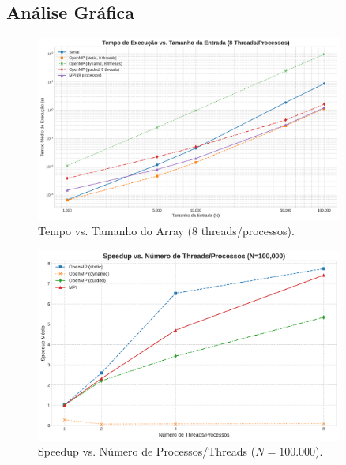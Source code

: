 \documentclass[12pt, a4paper]{article}
\begin{document}
\subsection{Análise Gráfica}

\begin{figure}[H]
    \centering
    \includegraphics[width=0.9\textwidth]{../graficos/tempo_vs_tamanho_8_threads.png}
    \caption{Tempo vs. Tamanho do Array (8 threads/processos).}
    \label{fig:tempo_vs_tamanho}
\end{figure}

\begin{figure}[H]
    \centering
    \includegraphics[width=0.9\textwidth]{../graficos/speedup_vs_processos_100000.png}
    \caption{Speedup vs. Número de Processos/Threads ($N=100.000$).}
    \label{fig:speedup}
\end{figure}
\end{document}
